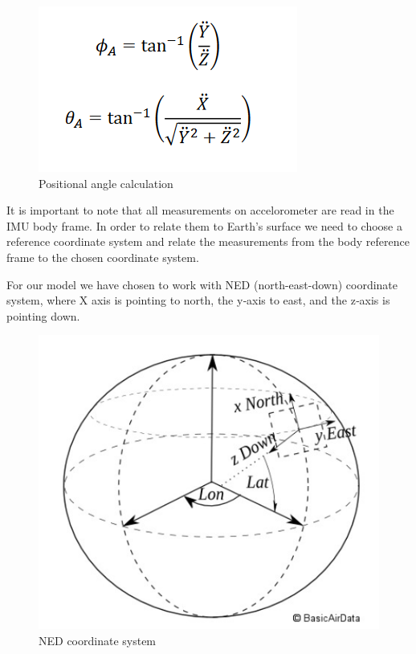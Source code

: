\begin{figure}[H]
    \begin{center}
    \includegraphics[scale = 0.7]{pictures/IMU/Accel_angles.png}
    \end{center}
    \caption{Positional angle calculation   }
    \label{fig:my_label}
\end{figure}

It is important to note that all measurements on accelorometer are read in the IMU body frame. In order to relate them to Earth's surface we need to choose a reference coordinate system and relate the measurements from the body reference frame to the chosen coordinate system.

For our model we have chosen to work with NED (north-east-down) coordinate system, where X axis is pointing to north, the y‐axis to east, and the z‐axis is pointing down.

\begin{figure}[H]
    \begin{center}
    \includegraphics[scale = 0.5]{pictures/IMU/NED_sys.png}
    \end{center}
    \caption{NED coordinate system}
    \label{fig:my_label}
\end{figure}

